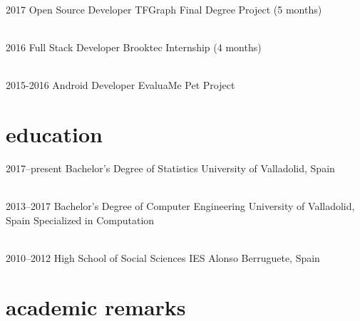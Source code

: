 \documentclass{friggeri-cv}
\begin{document}
    \begin{entrylist}

      \entry
      {2017}
      {Open Source Developer}
      {TFGraph}
      {Final Degree Project (5 months)}

      \\
      \entry
      {2016}
      {Full Stack Developer}
      {Brooktec}
      {Internship (4 months)}

      \\
      \entry
      {2015-2016}
      {Android Developer}
      {EvaluaMe}
      {Pet Project}

    \end{entrylist}




  \section{education}

    \begin{entrylist}

      \entry
      {2017--present}
      {Bachelor's Degree {\normalfont of Statistics}}
      {University of Valladolid, Spain}
      {}

      \\
      \entry
      {2013--2017}
      {Bachelor's Degree {\normalfont of Computer Engineering}}
      {University of Valladolid, Spain}
      {Specialized in Computation}

      \\
      \entry
      {2010--2012}
      {High School {\normalfont of Social Sciences}}
      {IES Alonso Berruguete, Spain}
      {}

    \end{entrylist}




  \section{academic remarks}
\end{document}
